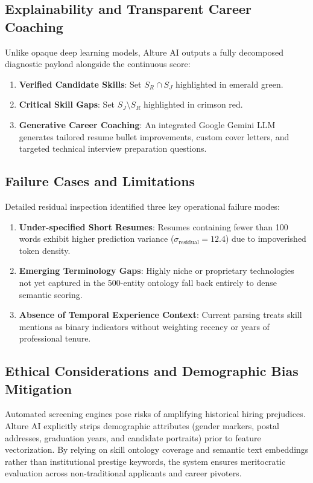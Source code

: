 \documentclass[conference]{IEEEtran}
\begin{document}
\subsection{Explainability and Transparent Career Coaching}
Unlike opaque deep learning models, Alture AI outputs a fully decomposed diagnostic payload alongside the continuous score:
\begin{enumerate}
    \item \textbf{Verified Candidate Skills}: Set $S_R \cap S_J$ highlighted in emerald green.
    \item \textbf{Critical Skill Gaps}: Set $S_J \setminus S_R$ highlighted in crimson red.
    \item \textbf{Generative Career Coaching}: An integrated Google Gemini LLM generates tailored resume bullet improvements, custom cover letters, and targeted technical interview preparation questions.
\end{enumerate}

\subsection{Failure Cases and Limitations}
Detailed residual inspection identified three key operational failure modes:
\begin{enumerate}
    \item \textbf{Under-specified Short Resumes}: Resumes containing fewer than 100 words exhibit higher prediction variance ($\sigma_{\text{residual}} = 12.4$) due to impoverished token density.
    \item \textbf{Emerging Terminology Gaps}: Highly niche or proprietary technologies not yet captured in the 500-entity ontology fall back entirely to dense semantic scoring.
    \item \textbf{Absence of Temporal Experience Context}: Current parsing treats skill mentions as binary indicators without weighting recency or years of professional tenure.
\end{enumerate}

\subsection{Ethical Considerations and Demographic Bias Mitigation}
Automated screening engines pose risks of amplifying historical hiring prejudices. Alture AI explicitly strips demographic attributes (gender markers, postal addresses, graduation years, and candidate portraits) prior to feature vectorization. By relying on skill ontology coverage and semantic text embeddings rather than institutional prestige keywords, the system ensures meritocratic evaluation across non-traditional applicants and career pivoters.
\end{document}
